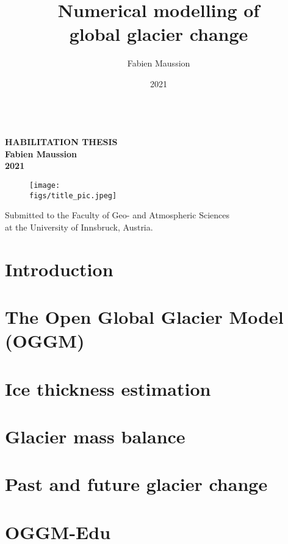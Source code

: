 \documentclass[twoside,10pt,openright]{scrbook} %
\author{Fabien Maussion}
\title{Numerical modelling of \\ global glacier change}
\subtitle{}
\date{2021}
\makeatletter
\newcommand{\figs}{../habil/img}
\renewcommand{\maketitle}{\begin{titlepage}%
  
	\begin{center}
	  	\vspace*{0cm}
		\Huge \bfseries \MakeUppercase{\@title} \mdseries \\[1.5cm]
				
		\Large \MakeUppercase{Habilitation thesis} \\	[1cm]		
		\Large Fabien Maussion \\	[0.1cm]		
		\large 2021 \\ [4.5cm]

		\begin{figure}[h!]
		\texttt{[image: \\figs/title\_pic.jpeg]} \\ [3cm]
		\end{figure}

		\large Submitted to the Faculty of Geo- and Atmospheric Sciences \\ at the University of Innsbruck, Austria.
	\end{center}
  \end{titlepage}%
  \setcounter{footnote}{0}%
}
\newif\iflong
\makeatother
\begin{document}
\setcounter{tocdepth}{1}

\maketitle

\frontmatter



\cleardoublepage
\renewcommand*\contentsname{Table of contents}
\tableofcontents

\mainmatter

\longfalse

\chapter{Introduction}
\label{chap1}



\chapter{The Open Global Glacier Model (OGGM)}
\label{chap2}




\chapter{Ice thickness estimation}
\label{chap3}






\chapter{Glacier mass balance}
\label{chap4}






\chapter{Past and future glacier change}
\label{chap5}






\chapter{OGGM-Edu}
\label{chap6}
\end{document}
